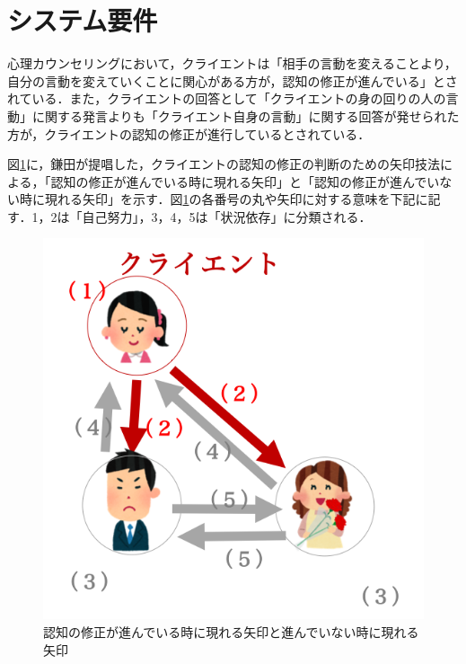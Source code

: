 \documentclass[shuuron]{kuee}
\begin{document}
\section{システム要件}
心理カウンセリングにおいて，クライエントは「相手の言動を変えることより，自分の言動を変えていくことに関心がある方が，認知の修正が進んでいる」\cite{zokad}とされている．また，クライエントの回答として「クライエントの身の回りの人の言動」に関する発言よりも「クライエント自身の言動」に関する回答が発せられた方が，クライエントの認知の修正が進行しているとされている．

図\ref{fig:arrow}に，鎌田\cite{鎌田穣2002臨床}が提唱した，クライエントの認知の修正の判断のための矢印技法による，「認知の修正が進んでいる時に現れる矢印」と「認知の修正が進んでいない時に現れる矢印」を示す．図\ref{fig:arrow}の各番号の丸や矢印に対する意味を下記に記す．1，2は「自己努力」，3，4，5は「状況依存」に分類される．

\begin{figure}
  \begin{center}
    \includegraphics[width=\linewidth]{arrow.png}
  \end{center}
  \caption{認知の修正が進んでいる時に現れる矢印と進んでいない時に現れる矢印}
  \label{fig:arrow}
\end{figure}
\end{document}
